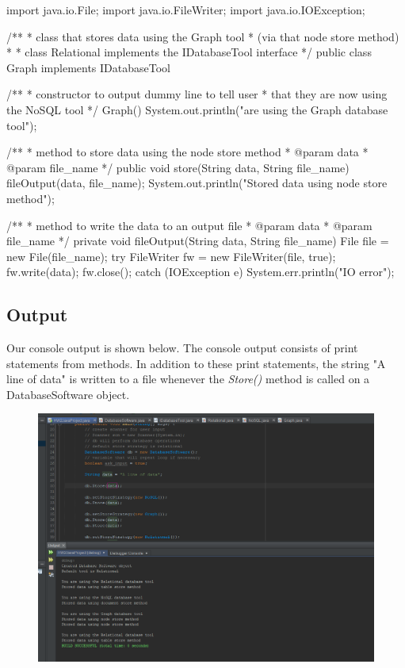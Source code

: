 \documentclass{article}
\begin{document}
\newpage

\begin{spverbatim}
	import java.io.File;
	import java.io.FileWriter;
	import java.io.IOException;
	
	/**
	* class that stores data using the Graph tool
	* (via that node store method)
	* 
	* class Relational implements the IDatabaseTool interface
	*/
	public class Graph implements IDatabaseTool {
		
	    /**
	    * constructor to output dummy line to tell user
	    * that they are now using the NoSQL tool
	    */
	    Graph(){
	         System.out.println("\nYou are using the Graph database tool");
	    }
		
	    /**
	    * method to store data using the node store method
	    * @param data
	    * @param file_name 
	    */
	    public void store(String data, String file_name){
	        fileOutput(data, file_name);
	        System.out.println("Stored data using node store method");
	    }
		
	    /**
	    * method to write the data to an output file
	    * @param data
	    * @param file_name 
	    */
	    private void fileOutput(String data, String file_name){
	        File file = new File(file_name);
	        try{
	            FileWriter fw = new FileWriter(file, true);
	            fw.write(data);
	            fw.close();
	        }
	        catch (IOException e){ System.err.println("IO error"); }
	    }
	}
\end{spverbatim}

\newpage

\subsection*{Output}

Our console output is shown below. The console output consists of print statements from methods. In addition to these print statements, the string "A line of data" is written to a file whenever the \emph{Store()} method is called on a DatabaseSoftware object.

\begin{figure}[h]
	\centering
	\includegraphics[scale=0.75]{console-output.png}
\end{figure}
\end{document}
